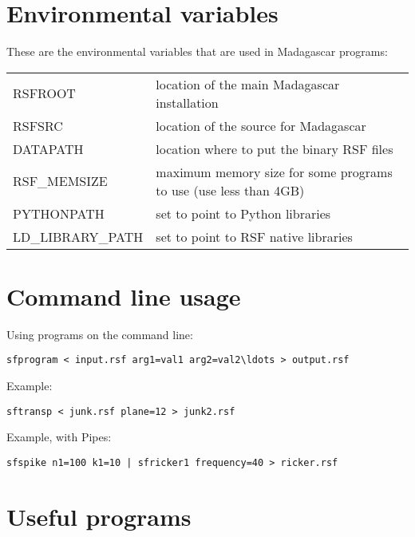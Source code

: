 \section{Environmental variables}

These are the environmental variables that are used in Madagascar programs:

\begin{tabular}{| l | l |}
    \hline
    RSFROOT & location of the main Madagascar installation \\
    RSFSRC & location of the source for Madagascar \\
    DATAPATH & location where to put the binary RSF files \\
    RSF\_MEMSIZE & maximum memory size for some programs to use (use less than 4GB) \\
    PYTHONPATH & set to point to Python libraries \\
    LD\_LIBRARY\_PATH & set to point to RSF native libraries \\
    \hline
\end{tabular}

\section{Command line usage}

Using programs on the command line:
\begin{verbatim}
sfprogram < input.rsf arg1=val1 arg2=val2\ldots > output.rsf
\end{verbatim}
Example:
\begin{verbatim}
sftransp < junk.rsf plane=12 > junk2.rsf
\end{verbatim}
Example, with Pipes:
\begin{verbatim}
sfspike n1=100 k1=10 | sfricker1 frequency=40 > ricker.rsf
\end{verbatim}

\section{Useful programs}

